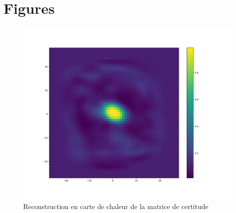 
\chapter{Figures} %

\label{Figures} %



\begin{table}
\caption[Tableau]{Matériel utilisé pour réaliser les modélisations}
\label{tab:materiel}
\end{table}

\begin{figure}[th]
\centering
\includegraphics[scale=0.4]{Figures/accuracy}
\decoRule
\caption[Figure]{Reconstruction en carte de chaleur de la matrice de certitude}
\label{fig:accuracy}
\end{figure}

